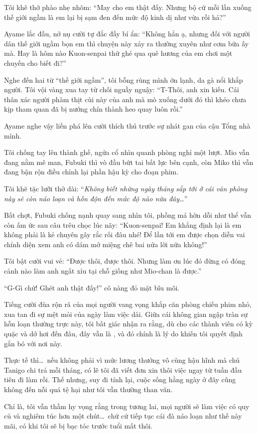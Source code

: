 \documentclass[../main.tex]{subfiles}
\begin{document}

Tôi khẽ thở phào nhẹ nhõm:
``May cho em thật đấy. Nhưng bộ cứ mỗi lần xuống thế giới ngầm là em lại bị sạm đen đến mức độ kinh dị như vừa rồi hả?''

Ayame lắc đầu, nở nụ cười tự đắc đầy bí ẩn:
``Không hẳn ạ, nhưng đối với người dân thế giới ngầm bọn em thì chuyện này xảy ra thường xuyên như cơm bữa ấy mà. Hay là hôm nào Kuon-senpai thử ghé qua quê hương của em chơi một chuyến cho biết đi?''

Nghe đến hai từ ``thế giới ngầm'', tôi bỗng rùng mình ớn lạnh, da gà nổi khắp người. Tôi vội vàng xua tay từ chối nguầy nguậy:
``T-Thôi, anh xin kiếu. Cái thân xác người phàm thịt cùi này của anh mà mò xuống dưới đó thì khéo chưa kịp tham quan đã bị nướng chín thành heo quay luôn rồi.''

Ayame nghe vậy liền phá lên cười thích thú trước sự nhát gan của cậu Tổng nhà mình.

Tôi chống tay lên thành ghế, ngửa cổ nhìn quanh phòng nghỉ một lượt. Mio vẫn đang nằm mê man, Fubuki thì vò đầu bứt tai bất lực bên cạnh, còn Miko thì vẫn đang bận rộn điều chỉnh lại phần hậu kỳ cho đoạn phim.

Tôi khẽ tặc lưỡi thở dài: ``\textit{Không biết những ngày tháng sắp tới ở cái văn phòng này sẽ còn náo loạn và hỗn độn đến mức độ nào nữa đây\dots}''

Bất chợt, Fubuki chống nạnh quay sang nhìn tôi, phồng má hờn dỗi như thể vẫn còn ấm ức sau câu trêu chọc lúc nãy:
``Kuon-senpai! Em khẳng định lại là em không phải là kẻ chuyên gây rắc rối đâu nhé! Để lần tới em được chọn diễn vai chính diện xem anh có dám mở miệng chê bai nửa lời nữa không!''

Tôi bật cười vui vẻ: ``Được thôi, được thôi. Nhưng làm ơn lúc đó đừng có đóng cảnh nào làm anh ngất xỉu tại chỗ giống như Mio-chan là được.''

``G-Gì chứ! Ghét anh thật đấy!'' cô nàng đỏ mặt bĩu môi.

Tiếng cười đùa rộn rã của mọi người vang vọng khắp căn phòng chiếu phim nhỏ, xua tan đi sự mệt mỏi của ngày làm việc dài. Giữa cái không gian ngập tràn sự hỗn loạn thường trực này, tôi bất giác nhận ra rằng, dù cho các thành viên có kỳ quặc và dở hơi đến đâu, đây vẫn là \hll, và đó chính là lý do khiến tôi quyết định gắn bó với nơi này.

Thực tế thì\dots\ nếu không phải vì mức lương thưởng vô cùng hậu hĩnh mà chú Tanigo chi trả mỗi tháng, có lẽ tôi đã viết đơn xin thôi việc ngay từ tuần đầu tiên đi làm rồi. Thế nhưng, suy đi tính lại, cuộc sống hằng ngày ở đây cũng không đến nỗi quá tệ hại như tôi vẫn thường than vãn.

Chỉ là, tôi vẫn thầm hy vọng rằng trong tương lai, mọi người sẽ làm việc có quy củ và nghiêm túc hơn một chút\dots\ chứ cứ tiếp tục cái đà náo loạn như thế này mãi, có khi tôi sẽ bị bạc tóc trước tuổi mất thôi.
\end{document}
